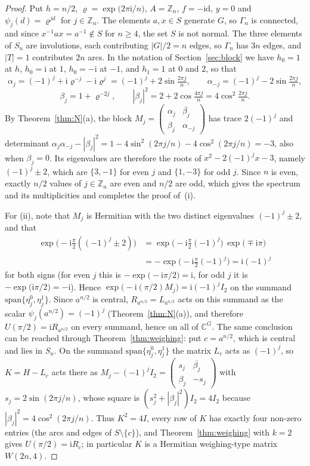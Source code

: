 \documentclass[preprint,11pt]{elsarticle}
\theoremstyle{definition}
\theoremstyle{remark}
\newcommand{\Z}{\mathbb Z}
\newcommand{\ii}{\mathrm i}
\begin{document}
\begin{proof}
Put $h=n/2$, $\varrho=\exp\bigl(2\pi\ii/n\bigr)$, $A=\Z_n$, $f=-\mathrm{id}$, $y=0$ and $\psi_j(d)=\varrho^{jd}$ for $j\in\Z_n$. The elements $a,x\in S$ generate $G$, so $\Gamma_n$ is connected, and since $x^{-1}ax=a^{-1}\notin S$ for $n\ge4$, the set $S$ is not normal. The three elements of $S_u$ are involutions, each contributing $|G|/2=n$ edges, so $\Gamma_n$ has $3n$ edges, and $|T|=1$ contributes $2n$ arcs. In the notation of Section~\ref{sec:block} we have $h_0=1$ at $h$, $h_0=\ii$ at $1$, $h_0=-\ii$ at $-1$, and $h_1=1$ at $0$ and $2$, so that
\[
\alpha_j=(-1)^j+\ii\varrho^{-j}-\ii\varrho^{j}=(-1)^j+2\sin\tfrac{2\pi j}{n},\qquad \alpha_{-j}=(-1)^j-2\sin\tfrac{2\pi j}{n},
\]
\[
\beta_j=1+\varrho^{-2j},\qquad|\beta_j|^2=2+2\cos\tfrac{4\pi j}{n}=4\cos^2\tfrac{2\pi j}{n}.
\]
By Theorem~\ref{thm:N}(a), the block $M_j=\begin{pmatrix}\alpha_j&\overline{\beta_j}\\\beta_j&\alpha_{-j}\end{pmatrix}$ has trace $2(-1)^j$ and determinant $\alpha_j\alpha_{-j}-|\beta_j|^2=1-4\sin^2(2\pi j/n)-4\cos^2(2\pi j/n)=-3$, also when $\beta_j=0$. Its eigenvalues are therefore the roots of $x^2-2(-1)^jx-3$, namely $(-1)^j\pm2$, which are $\{3,-1\}$ for even $j$ and $\{1,-3\}$ for odd $j$. Since $n$ is even, exactly $n/2$ values of $j\in\Z_n$ are even and $n/2$ are odd, which gives the spectrum and its multiplicities and completes the proof of~(i).

For (ii), note that $M_j$ is Hermitian with the two distinct eigenvalues $(-1)^j\pm2$, and that
\begin{align*}
\exp\bigl(-\ii\tfrac\pi2((-1)^j\pm2)\bigr)&=\exp\bigl(-\ii\tfrac\pi2(-1)^j\bigr)\,\exp\bigl(\mp\ii\pi\bigr)\\
&=-\exp\bigl(-\ii\tfrac\pi2(-1)^j\bigr)=\ii(-1)^j
\end{align*}
for both signs (for even $j$ this is $-\exp\bigl(-\ii\pi/2\bigr)=\ii$, for odd $j$ it is $-\exp\bigl(\ii\pi/2\bigr)=-\ii$). Hence $\exp\bigl(-\ii(\pi/2)M_j\bigr)=\ii(-1)^jI_2$ on the summand $\mathrm{span}\{\eta^0_j,\eta^1_j\}$. Since $a^{n/2}$ is central, $R_{a^{n/2}}=L_{a^{n/2}}$ acts on this summand as the scalar $\psi_j(a^{n/2})=(-1)^j$ (Theorem~\ref{thm:N}(a)), and therefore $U(\pi/2)=\ii R_{a^{n/2}}$ on every summand, hence on all of $\mathbb C^G$. The same conclusion can be reached through Theorem~\ref{thm:weighing}: put $c=a^{n/2}$, which is central and lies in $S_u$. On the summand $\mathrm{span}\{\eta^0_j,\eta^1_j\}$ the matrix $L_c$ acts as $(-1)^j$, so $K=H-L_c$ acts there as $M_j-(-1)^jI_2=\begin{pmatrix}s_j&\overline{\beta_j}\\\beta_j&-s_j\end{pmatrix}$ with $s_j=2\sin(2\pi j/n)$, whose square is $(s_j^2+|\beta_j|^2)I_2=4I_2$ because $|\beta_j|^2=4\cos^2(2\pi j/n)$. Thus $K^2=4I$, every row of $K$ has exactly four non-zero entries (the arcs and edges of $S\setminus\{c\}$), and Theorem~\ref{thm:weighing} with $k=2$ gives $U(\pi/2)=\ii R_c$; in particular $K$ is a Hermitian weighing-type matrix $W(2n,4)$.


\end{proof}
\end{document}
